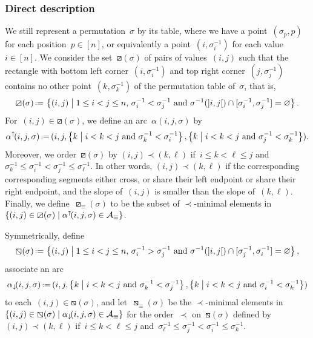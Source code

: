 \documentclass{amsart}
\theoremstyle{definition}
\newcommand{\set}[2]{\left\{ #1 \;\middle|\; #2 \right\}} %
\newcommand{\eqdef}{\mbox{\,\raisebox{0.2ex}{\scriptsize\ensuremath{\mathrm:}}\ensuremath{=}\,}} %
\newcommand{\Vincent}[1]{\todo[color=blue!30,inline]{#1 \\ \hfill --- V.}}
\newcommand{\arcs}{{\mathcal{A}}} %
\newcommand{\arcDown}{\smash{\alpha_{\downarrow\!}}} %
\newcommand{\arcUp}{\smash{\alpha^{\uparrow\!}}} %
\begin{document}
\subsubsection{Direct description}


We still represent a permutation~$\sigma$ by its table, where we have a point~$(\sigma_p, p)$ for each position~$p \in [n]$, or equivalently a point~$(i, \sigma^{-1}_i)$ for each value~$i \in [n]$.
We consider the set~$\boxslash(\sigma)$ of pairs of values~$(i,j)$ such that the rectangle with bottom left corner~$(i, \sigma^{-1}_i)$ and top right corner~$(j, \sigma^{-1}_j)$ contains no other point~$(k, \sigma^{-1}_k)$ of the permutation table of~$\sigma$, that is,
\[
\boxslash(\sigma) \eqdef \set{(i, j)}{1 \le i < j \le n, \, \sigma^{-1}_i < \sigma^{-1}_j \text{ and } \sigma^{-1}(]i, j[) \cap {[\sigma^{-1}_i, \sigma^{-1}_j]} = \varnothing}.
\]
For~$(i, j) \in \boxslash(\sigma)$, we define an arc~$\alpha(i, j, \sigma)$ by
\[
\arcUp(i, j, \sigma) \eqdef (i, j, \set{k}{i < k < j \text{ and } \sigma^{-1}_k < \sigma^{-1}_i}, \set{k}{i < k < j \text{ and } \sigma^{-1}_j < \sigma^{-1}_k}).
\]
Moreover, we order~$\boxslash(\sigma)$ by $(i, j) \prec (k,\ell)$ if~$i \le k < \ell \le j$ and~$\sigma^{-1}_k \le \sigma^{-1}_i < \sigma^{-1}_j \le \sigma^{-1}_\ell$.
In other words, $(i, j) \prec (k, \ell)$ if the corresponding corresponding segments either cross, or share their left endpoint or share their right endpoint, and the slope of~$(i, j)$ is smaller than the slope of~$(k, \ell)$.
Finally, we define~$\boxslash_\equiv(\sigma)$ to be the subset of $\prec$-minimal elements in~$\set{(i, j) \in \boxslash(\sigma)}{\arcUp(i, j, \sigma) \in \arcs_\equiv}$.

Symmetrically, define
\[
\boxbslash(\sigma) \eqdef \set{(i, j)}{1 \le i < j \le n, \, \sigma^{-1}_i > \sigma^{-1}_j \text{ and } \sigma^{-1}({]i,j[}) \cap {[\sigma^{-1}_j, \sigma^{-1}_i]} = \varnothing},
\]
associate an arc
\[
\arcDown(i, j, \sigma) \eqdef (i, j, \set{k}{i < k < j \text{ and } \sigma^{-1}_k < \sigma^{-1}_j}, \set{k}{i < k < j \text{ and } \sigma^{-1}_i < \sigma^{-1}_k})
\]
to each~${(i,j) \in \boxbslash(\sigma)}$, and let~$\boxbslash_\equiv(\sigma)$ be the $\prec$-minimal elements in~$\set{(i, j) \in \boxbslash(\sigma)}{\arcDown(i, j, \sigma) \in \arcs_\equiv}$ for the order~$\prec$ on~$\boxbslash(\sigma)$ defined by $(i, j) \prec (k,\ell)$ if~$i \le k < \ell \le j$ and~$\sigma^{-1}_\ell \le \sigma^{-1}_j < \sigma^{-1}_i \le \sigma^{-1}_k$.
\end{document}
